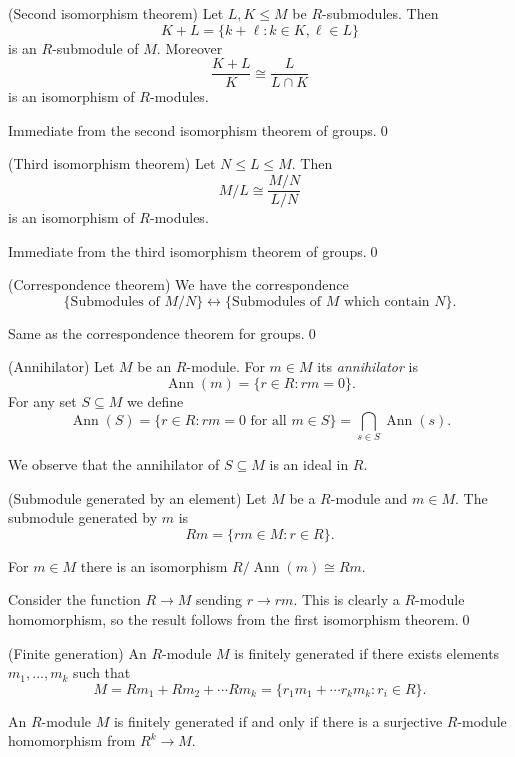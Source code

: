 \documentclass{article}
\DeclareMathOperator{\Ann}{Ann}
\begin{document}
\begin{theorem}
	(Second isomorphism theorem) Let $ L,K\le M $ be $ R $-submodules. Then
	\[
		K+L=\{k+\ell :k\in K, \ell\in L\} 
	\]
	is an $ R $-submodule of $ M $. Moreover
	\[
		\frac{K+L}K\cong \frac L{L\cap K}
	\]
	is an isomorphism of $ R $-modules.
\end{theorem}
\pf Immediate from the second isomorphism theorem of groups.\qed
\begin{theorem}
	(Third isomorphism theorem) Let $ N\le L\le M $. Then
	\[
		M/L\cong\frac{M/N}{L/N}
	\]
	is an isomorphism of $ R $-modules.
\end{theorem}
\pf Immediate from the third isomorphism theorem of groups.\qed
\begin{theorem}
	(Correspondence theorem) We have the correspondence
	\[
		\{\text{Submodules of } M/N\}\leftrightarrow{} \{\text{Submodules of } M \text{ which contain } N \}.
	\]
\end{theorem}
\pf Same as the correspondence theorem for groups.\qed
\begin{definition}
	(Annihilator) Let $ M $ be an $ R $-module. For $ m\in M $ its \textit{annihilator} is 
	\[
		\Ann(m)=\{r\in R:rm=0\}.
	\]
	For any set $ S\subseteq M $ we define
	\[
		\Ann(S)=\{r\in R:rm=0\text{ for all } m \in S\}=\bigcap_{s\in S}\Ann(s).
	\]
\end{definition}
We observe that the annihilator of $ S\subseteq M $ is an ideal in $ R $.
\begin{definition}
(Submodule generated by an element) Let $ M $ be a $ R $-module and $ m\in M $. The submodule generated by $ m $ is
\[
	Rm=\{rm\in M:r\in R\}.
\]
\end{definition}
\begin{proposition}
  For $ m\in M $ there is an isomorphism $ R/\Ann(m)\cong Rm $.
\end{proposition}
\pf Consider the function $ R\to M $ sending $ r\to rm $. This is clearly a $ R $-module homomorphism, so the result follows from the first isomorphism theorem.\qed
\begin{definition}
	(Finite generation) An $ R $-module $ M $ is finitely generated if there exists elements $ m_1,\dots,m_k $ such that
	\[
		M=Rm_1+Rm_2+\cdots Rm_k=\{r_1m_1+\cdots r_km_k:r_i\in R\}.
	\]
\end{definition}
\begin{lemma}
  An $ R $-module $ M $ is finitely generated if and only if there is a surjective $ R $-module homomorphism from $ R^k\to M $.
\end{lemma}
\end{document}
